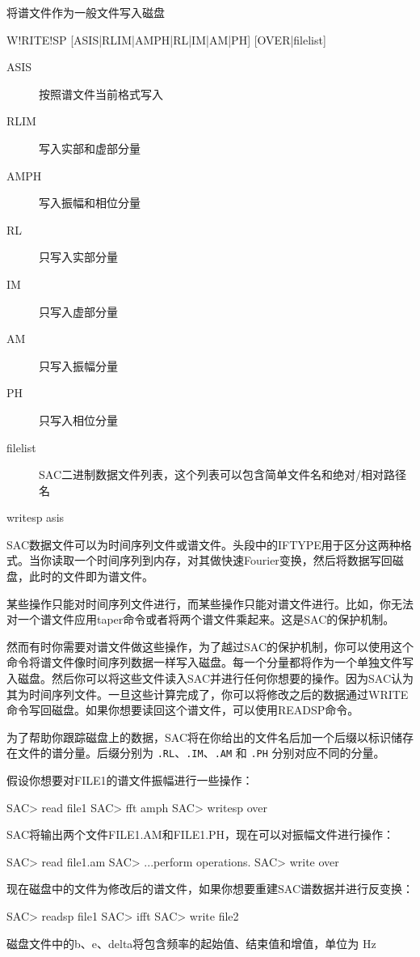 \label{cmd:writesp}

将谱文件作为一般文件写入磁盘

\begin{SACSTX}
W!RITE!SP [ASIS|RLIM|AMPH|RL|IM|AM|PH] [OVER|filelist]
\end{SACSTX}

\begin{description}
\item [ASIS]  按照谱文件当前格式写入
\item [RLIM]  写入实部和虚部分量
\item [AMPH]  写入振幅和相位分量
\item [RL]  只写入实部分量
\item [IM]  只写入虚部分量
\item [AM]  只写入振幅分量
\item [PH]  只写入相位分量
\item [filelist]  SAC二进制数据文件列表，这个列表可以包含简单文件名和绝对/相对路径名
\end{description}

\begin{SACDFT}
writesp asis
\end{SACDFT}

SAC数据文件可以为时间序列文件或谱文件。头段中的IFTYPE用于区分这两种格式。当你读取一个时间序列到内存，对其做快速Fourier变换，然后将数据写回磁盘，此时的文件即为谱文件。

某些操作只能对时间序列文件进行，而某些操作只能对谱文件进行。比如，你无法对一个谱文件应用taper命令或者将两个谱文件乘起来。这是SAC的保护机制。

然而有时你需要对谱文件做这些操作，为了越过SAC的保护机制，你可以使用这个命令将谱文件像时间序列数据一样写入磁盘。每一个分量都将作为一个单独文件写入磁盘。然后你可以将这些文件读入SAC并进行任何你想要的操作。因为SAC认为其为时间序列文件。一旦这些计算完成了，你可以将修改之后的数据通过WRITE命令写回磁盘。如果你想要读回这个谱文件，可以使用READSP命令。

为了帮助你跟踪磁盘上的数据，SAC将在你给出的文件名后加一个后缀以标识储存
在文件的谱分量。后缀分别为 \texttt{.RL}、\texttt{.IM}、\texttt{.AM} 和
\texttt{.PH} 分别对应不同的分量。

假设你想要对FILE1的谱文件振幅进行一些操作：
\begin{SACCode}
SAC> read file1
SAC> fft amph
SAC> writesp over
\end{SACCode}

SAC将输出两个文件FILE1.AM和FILE1.PH，现在可以对振幅文件进行操作：
\begin{SACCode}
SAC> read file1.am
SAC> ...perform operations.
SAC> write over
\end{SACCode}

现在磁盘中的文件为修改后的谱文件，如果你想要重建SAC谱数据并进行反变换：
\begin{SACCode}
SAC> readsp file1
SAC> ifft
SAC> write file2
\end{SACCode}

磁盘文件中的b、e、delta将包含频率的起始值、结束值和增值，单位为 \si{Hz}
